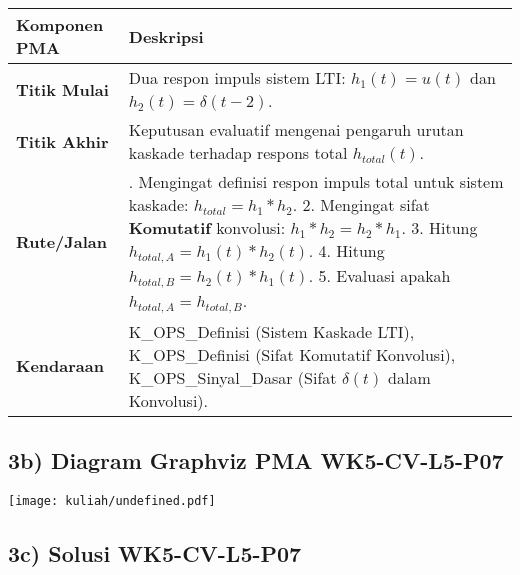 \documentclass[
  letterpaper,
  DIV=11,
  numbers=noendperiod]{scrreprt}
\begin{document}
\begin{longtable}[]{@{}
  >{\raggedright\arraybackslash}p{}
  >{\raggedright\arraybackslash}p{}@{}}
\toprule\noalign{}
\begin{minipage}[b]{\linewidth}\raggedright
Komponen PMA
\end{minipage} & \begin{minipage}[b]{\linewidth}\raggedright
Deskripsi
\end{minipage} \\
\midrule\noalign{}
\endhead
\bottomrule\noalign{}
\endlastfoot
\textbf{Titik Mulai} & Dua respon impuls sistem LTI: \(h_1(t) = u(t)\)
dan \(h_2(t) = \delta(t-2)\). \\
\textbf{Titik Akhir} & Keputusan evaluatif mengenai pengaruh urutan
kaskade terhadap respons total \(h_{total}(t)\). \\
\textbf{Rute/Jalan} & 1. Mengingat definisi respon impuls total untuk
sistem kaskade: \(h_{total} = h_1 * h_2\). 2. Mengingat sifat
\textbf{Komutatif} konvolusi: \(h_1 * h_2 = h_2 * h_1\). 3. Hitung
\(h_{total, A} = h_1(t) * h_2(t)\). 4. Hitung
\(h_{total, B} = h_2(t) * h_1(t)\). 5. Evaluasi apakah
\(h_{total, A} = h_{total, B}\). \\
\textbf{Kendaraan} & K\_OPS\_Definisi (Sistem Kaskade LTI),
K\_OPS\_Definisi (Sifat Komutatif Konvolusi), K\_OPS\_Sinyal\_Dasar
(Sifat \(\delta(t)\) dalam Konvolusi). \\
\end{longtable}

\subsection{3b) Diagram Graphviz PMA
WK5-CV-L5-P07}\label{b-diagram-graphviz-pma-wk5-cv-l5-p07}

\texttt{[image: kuliah/undefined.pdf]}

\subsection{3c) Solusi WK5-CV-L5-P07}\label{c-solusi-wk5-cv-l5-p07}
\end{document}

